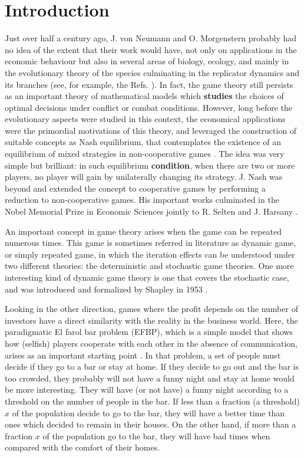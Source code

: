 \documentclass[3p, 11pt]{elsarticle}
\begin{document}
\section{Introduction}

Just over half a century ago, J. von Neumann and O. Morgenstern \cite%
{Neumann1944} probably had no idea of the extent that their work would have,
not only on applications in the economic behaviour but also in several areas
of biology, ecology, and mainly in the evolutionary theory of the species 
\cite{Maynard Smith 1982} culminating in the replicator dynamics \cite%
{Hofbauer2003,Nowak2006} and its branches (see, for example, the Refs. \cite%
{Hauert2005,Melbinger2010}). In fact, the game theory still persists as an
important theory of mathematical models which \textbf{studies} the choices
of optimal decisions under conflict or combat conditions. However, long
before the evolutionary aspects were studied in this context, the economical
applications were the primordial motivations of this theory, and leveraged
the construction of suitable concepts as Nash equilibrium, that contemplates
the existence of an equilibrium of mixed strategies in non-cooperative games 
\cite{Nash}. The idea was very simple but brilliant: in such equilibrium 
\textbf{condition}, when there are two or more players, no player will gain
by unilaterally changing its strategy. J. Nash was beyond and extended the
concept to cooperative games by performing a reduction to non-cooperative
games. His important works culminated in the Nobel Memorial Prize in
Economic Sciences jointly to R. Selten and J. Harsany \cite{Harsanyi and
Selten}.

An important concept in game theory arises when the game can be repeated
numerous times. This game is sometimes referred in literature as dynamic
game, or simply repeated game, in which the iteration effects can be
understood under two different theories: the deterministic and stochastic
game theories. One more interesting kind of dynamic game theory is one that
covers the stochastic case, and was introduced and formalized by Shapley in
1953 \cite{Shapley1953,Mertens1981,Solan2015}.

Looking in the other direction, games where the profit depends on the number
of investors have a direct similarity with the reality in the business
world. Here, the paradigmatic El farol bar problem (EFBP), which is a simple
model that shows how (selfish) players cooperate with each other in the
absence of communication, arises as an important starting point \cite%
{Arthur1994}. In that problem, a set of people must decide if they go to a
bar or stay at home. If they decide to go out and the bar is too crowded,
they probably will not have a funny night and stay at home would be more
interesting. They will have (or not have) a funny night according to a
threshold on the number of people in the bar. If less than a fraction (a
threshold) $x$ of the population decide to go to the bar, they will have a
better time than ones which decided to remain in their houses. On the other
hand, if more than a fraction $x$ of the population go to the bar, they will
have bad times when compared with the comfort of their homes.
\end{document}
